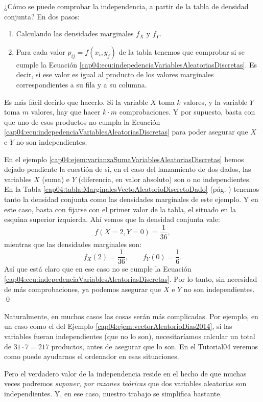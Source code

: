 ¿Cómo se puede comprobar la independencia, a partir de la tabla de densidad conjunta? En dos pasos:
\begin{enumerate}
  \item Calculando las densidades marginales $f_X$ y $f_Y$.
  \item Para cada valor $p_{ij}=f(x_i,y_j)$ de la tabla tenemos que comprobar si se cumple la Ecuación \ref{cap04:ecu:indepedenciaVariablesAleatoriasDiscretas}. Es decir, si ese valor es igual al producto de los valores marginales correspondientes a su fila y a su columna.
\end{enumerate}
Es más fácil decirlo que hacerlo. Si la variable $X$ toma $k$ valores, y la variable $Y$ toma $m$ valores, hay que hacer $k\cdot m$ comprobaciones. Y por supuesto, basta con que uno de esos productos no cumpla la Ecuación \ref{cap04:ecu:indepedenciaVariablesAleatoriasDiscretas} para poder asegurar que $X$ e $Y$ no son independientes.


\begin{ejemplo}
\label{cap04:ejem:IndependenciaVariablesAleatoriasDiscretas}
En el ejemplo \ref{cap04:ejem:varianzaSumaVariablesAleatoriasDiscretas} hemos dejado pendiente la cuestión de si, en el caso del lanzamiento de dos dados, las variables $X$ (suma) e $Y$ (diferencia, en valor absoluto) son o no independientes. En la Tabla \ref{cap04:tabla:MarginalesVectoAleatorioDiscretoDado} (pág. \pageref{cap04:tabla:MarginalesVectoAleatorioDiscretoDado}) tenemos tanto la densidad conjunta como las densidades marginales de este ejemplo. Y en este caso, basta con fijarse con el primer valor de la tabla, el situado en la esquina superior izquierda. Ahí vemos que la densidad conjunta vale:
\[f(X=2, Y=0)=\dfrac{1}{36},\]
mientras que las densidades marginales son:
\[
f_X(2)=\dfrac{1}{36},\qquad f_Y(0)=\dfrac{1}{6}.
\]
Así que está claro que en ese caso no se cumple la Ecuación \ref{cap04:ecu:indepedenciaVariablesAleatoriasDiscretas}. Por lo tanto, sin necesidad de más comprobaciones, ya podemos asegurar que $X$ e $Y$ no son independientes.
\qed
\end{ejemplo}
Naturalmente, en muchos casos las cosas serán más complicadas. Por ejemplo, en un caso como el del Ejemplo \ref{cap04:ejem:vectorAleatorioDias2014}, si las variables fueran independientes (que no lo son), necesitaríamos calcular un total de $31\cdot 7=217$ productos, antes de asegurar que lo son. En el Tutorial04 veremos como puede ayudarnos el ordenador en esas situaciones.

Pero el verdadero valor de la independencia reside en el hecho de que muchas veces podremos {\em suponer, por razones teóricas} que dos variables aleatorias son independientes. Y, en ese caso, nuestro trabajo se simplifica bastante.

